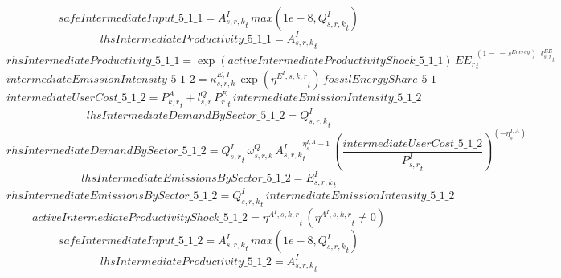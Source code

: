 \begin{dmath*}
safeIntermediateInput\_5\_1\_1 = {{A^{I}_{s,r,k}}}_{t}\, max(1e-8,{{Q^{I}_{s,r,k}}}_{t})
\end{dmath*}
\begin{dmath*}
lhsIntermediateProductivity\_5\_1\_1 = {{A^{I}_{s,r,k}}}_{t}
\end{dmath*}
\begin{dmath*}
rhsIntermediateProductivity\_5\_1\_1 = \exp\left({activeIntermediateProductivityShock\_5\_1\_1}\right)\, {{EE_r}}_{t}^{\left(1=={{s^{Energy}}}\right)\, {{\ell^{EE}_{s,r}}}_{t}}
\end{dmath*}
\begin{dmath*}
intermediateEmissionIntensity\_5\_1\_2 = {{\kappa^{E,I}_{s,r,k}}}\, \exp\left({{\eta^{E^{I},s,k,r}}}_{t}\right)\, {fossilEnergyShare\_5\_1}
\end{dmath*}
\begin{dmath*}
intermediateUserCost\_5\_1\_2 = {{P^{A}_{k,r}}}_{t}+{{l^{Q}_{s,r}}}\, {{P^E_r}}_{t}\, {intermediateEmissionIntensity\_5\_1\_2}
\end{dmath*}
\begin{dmath*}
lhsIntermediateDemandBySector\_5\_1\_2 = {{Q^{I}_{s,r,k}}}_{t}
\end{dmath*}
\begin{dmath*}
rhsIntermediateDemandBySector\_5\_1\_2 = {{Q^{I}_{s,r}}}_{t}\, {{\omega^{Q}_{s,r,k}}}\, {{A^{I}_{s,r,k}}}_{t}^{{{\eta^{I,A}_{s}}}-1}\, \left(\frac{{intermediateUserCost\_5\_1\_2}}{{{P^{I}_{s,r}}}_{t}}\right)^{\left(-{{\eta^{I,A}_{s}}}\right)}
\end{dmath*}
\begin{dmath*}
lhsIntermediateEmissionsBySector\_5\_1\_2 = {{E^I_{s,r,k}}}_{t}
\end{dmath*}
\begin{dmath*}
rhsIntermediateEmissionsBySector\_5\_1\_2 = {{Q^{I}_{s,r,k}}}_{t}\, {intermediateEmissionIntensity\_5\_1\_2}
\end{dmath*}
\begin{dmath*}
activeIntermediateProductivityShock\_5\_1\_2 = {{\eta^{A^{I},s,k,r}}}_{t}\, \left({{\eta^{A^{I},s,k,r}}}_{t}\neq 0\right)
\end{dmath*}
\begin{dmath*}
safeIntermediateInput\_5\_1\_2 = {{A^{I}_{s,r,k}}}_{t}\, max(1e-8,{{Q^{I}_{s,r,k}}}_{t})
\end{dmath*}
\begin{dmath*}
lhsIntermediateProductivity\_5\_1\_2 = {{A^{I}_{s,r,k}}}_{t}
\end{dmath*}
